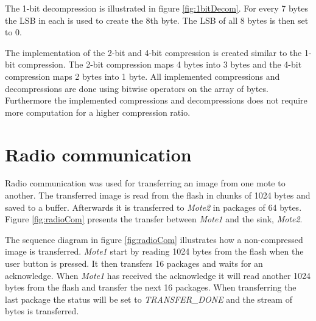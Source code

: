 The 1-bit decompression is illustrated in figure \ref{fig:1bitDecom}. For every 7 bytes the LSB in each is used to create the 8th byte. The LSB of all 8 bytes is then set to 0.



The implementation of the 2-bit and 4-bit compression is created similar to the 1-bit compression. The 2-bit compression maps 4 bytes into 3 bytes and the 4-bit compression maps 2 bytes into 1 byte.
\FloatBarrier
All implemented compressions and decompressions are done using bitwise operators on the array of bytes. Furthermore the implemented compressions and decompressions does not require more computation for a higher compression ratio.


\section{Radio communication}
Radio communication was used for transferring an image from one mote to another. The transferred image is read from the flash in chunks of 1024 bytes and saved to a buffer. Afterwards it is transferred to \emph{Mote2} in packages of 64 bytes. Figure \ref{fig:radioCom} presents the transfer between \emph{Mote1} and the sink, \emph{Mote2}.






The sequence diagram in figure \ref{fig:radioCom} illustrates how a non-compressed image is transferred. \emph{Mote1} start by reading 1024 bytes from the flash when the user button is pressed. It then transfers 16 packages and waits for an acknowledge. When \emph{Mote1} has received the acknowledge it will read another 1024 bytes from the flash and transfer the next 16 packages. When transferring the last package the status will be set to \emph{TRANSFER\_DONE} and the stream of bytes is transferred.

\FloatBarrier


